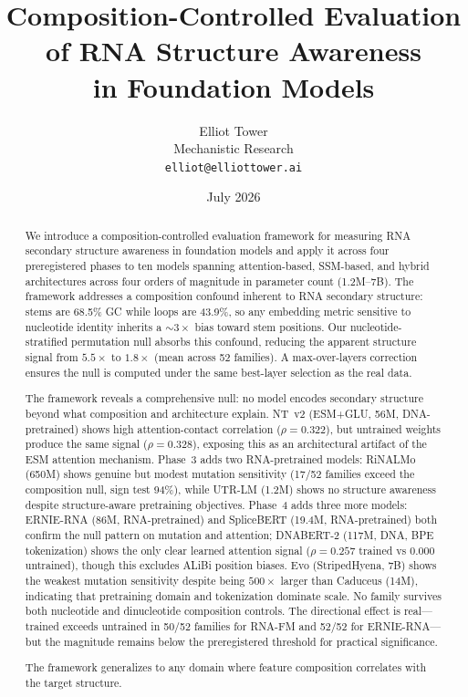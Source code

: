 \documentclass[11pt]{article}
\title{Composition-Controlled Evaluation of RNA Structure Awareness\\
  in Foundation Models}
\author{Elliot Tower\\
  Mechanistic Research\\
  \texttt{elliot@elliottower.ai}}
\date{July 2026}
\begin{document}
\maketitle

\begin{abstract}
We introduce a composition-controlled evaluation framework for
measuring RNA secondary structure awareness in foundation models and
apply it across four preregistered phases to ten models spanning
attention-based, SSM-based, and hybrid architectures across four
orders of magnitude in parameter count (1.2M--7B).
The framework addresses a composition confound inherent to RNA
secondary structure: stems are 68.5\% GC while loops are 43.9\%, so
any embedding metric sensitive to nucleotide identity inherits a
${\sim}3\times$ bias toward stem positions.  Our nucleotide-stratified
permutation null absorbs this confound, reducing the apparent
structure signal from $5.5\times$ to $1.8\times$ (mean across 52
families).  A max-over-layers correction ensures the null is computed
under the same best-layer selection as the real data.

The framework reveals a comprehensive null: no model encodes secondary
structure beyond what composition and architecture explain.  NT~v2
(ESM+GLU, 56M, DNA-pretrained) shows high attention-contact
correlation ($\rho = 0.322$), but untrained weights produce the same
signal ($\rho = 0.328$), exposing this as an architectural artifact of
the ESM attention mechanism.  Phase~3 adds two RNA-pretrained models:
RiNALMo (650M) shows genuine but modest mutation sensitivity (17/52
families exceed the composition null, sign test 94\%), while UTR-LM
(1.2M) shows no structure awareness despite structure-aware
pretraining objectives.  Phase~4 adds three more models: ERNIE-RNA
(86M, RNA-pretrained) and SpliceBERT (19.4M, RNA-pretrained) both
confirm the null pattern on mutation and attention; DNABERT-2 (117M,
DNA, BPE tokenization) shows the only clear learned attention signal
($\rho = 0.257$ trained vs $0.000$ untrained), though this excludes
ALiBi position biases.  Evo (StripedHyena, 7B) shows the weakest
mutation sensitivity despite being $500\times$ larger than Caduceus
(14M), indicating that pretraining domain and tokenization dominate
scale.  No family survives both nucleotide and dinucleotide
composition controls.  The directional effect is real---trained
exceeds untrained in 50/52 families for RNA-FM and 52/52 for
ERNIE-RNA---but the magnitude remains below the preregistered
threshold for practical significance.

The framework generalizes to any domain where feature composition
correlates with the target structure.
\end{abstract}
\end{document}
